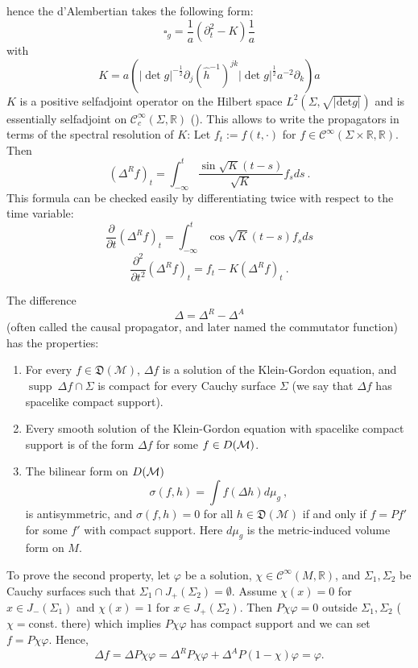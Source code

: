 \documentclass[11pt]{article}
\newcommand{\D}{\mathfrak{D}}
\newcommand{\Mcal}{\mathcal{M}}
\DeclareMathOperator{\supp}{\mathrm{supp}}      %
\newcommand{\RR}{\mathbb{R}}           %
\newcommand{\ph}{\varphi}
\newcommand{\1}{\mathds{1}}                         %
\newcommand{\be}{\begin{equation}}
\newcommand{\ee}{\end{equation}}
\begin{document}
{\begin{exa}
\begin{enumerate}
hence the d'Alembertian takes the following form:
\[\square_g=\frac{1}{a}(\partial_t^2-K)\frac{1}{a}\]
with 
\[K=a\left(|\det{g}|^{-\frac12}\partial_{j}(\hat{h}^{-1})^{jk}|\det{g}|^{\frac12}a^{-2}\partial_{k}\right)a\] 
$K$ is a positive selfadjoint operator on the Hilbert space $L^2(\Sigma,\sqrt{|\mathrm{det}g|})$ and is essentially selfadjoint on $\mathcal{C}^{\infty}_c(\Sigma,\mathbb{R})$
(\cite{Chernoff,Kay78,BrumF14}).
%
{This allows to write the propagators in terms of the spectral resolution of $K$: Let $f_t:=f(t,\cdot)$ for $f\in\mathcal{C}^{\infty}(\Sigma\times\mathbb{R},\mathbb{R})$. Then
\[(\Delta^Rf)_t=\int_{-\infty}^t \frac{\sin\sqrt{K}(t-s)}{\sqrt{K}}f_sds\ .\]}
{This formula can be checked easily by differentiating twice with respect to the time variable:} 
{\[\frac{\partial}{\partial t}(\Delta^Rf)_t=\int_{-\infty}^t \cos{\sqrt{K}(t-s)}f_sds \]}
{\[\frac{\partial^2}{\partial t^2}(\Delta^Rf)_t=f_t-K(\Delta^Rf)_t\ .\]}
\end{enumerate}
\end{exa}
The difference
\[\Delta=\Delta^R-\Delta^A\]
(often called the causal propagator, and later named the commutator function) has the properties:
\begin{enumerate}
\item For every $f\in\D(\Mcal)$, $\Delta f$ is a solution of the Klein-Gordon equation, and $\supp\ \Delta f\cap\Sigma$ is compact for every Cauchy surface $\Sigma$ (we say that $\Delta f$ has {{spacelike compact support}}).
\item Every smooth solution of the Klein-Gordon equation with spacelike compact support is of the form $\Delta f$ for some $f\in \mathcal \D(\Mcal)$.
\item The bilinear form on $\mathcal \D(\Mcal)$
\be\label{bilinear}
\sigma(f,h)=\int f(\Delta h) d\mu_{g}\ ,
\ee
is antisymmetric, and $\sigma(f,h)=0$ for all $h\in\D(\Mcal)$ if and only if $f=Pf'$ for some $f'$ with compact support. Here $d\mu_{g}$ is the metric-induced volume form on $M$.
\end{enumerate}
To prove the second property, let $\ph$ be a solution, $\chi \in \mathcal{C}^\infty(M,\RR)$, and $\Sigma_1, \Sigma_2$ be Cauchy surfaces such that $\Sigma_1 \cap J_+(\Sigma_2)=\emptyset$. Assume $\chi(x)=0$ for $x \in J_-(\Sigma_1)$ and $\chi(x)=1$ for $x \in J_+(\Sigma_2)$. Then $P \chi \ph=0$ outside $\Sigma_1, \Sigma_2$ ($\chi =$const. there) which implies $P\chi \ph$ has compact support and we can set $f=P\chi \ph$. Hence,
\[
 \Delta f= \Delta P \chi \ph =  \Delta^R P \chi \ph +  \Delta^A P(1-\chi)\ph = \ph.
\]

}
\end{document}
